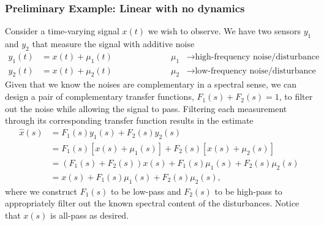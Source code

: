 \documentclass[a4paper]{article}
\begin{document}
\subsubsection*{Preliminary Example: Linear with no dynamics}
Consider a time-varying signal $x(t)$ we wish to observe.
We have two sensors $y_1$ and $y_2$ that measure the signal with additive noise
\begin{equation}
\begin{split}
y_1(t) &= x(t) + \mu_1(t) \\
y_2(t) &= x(t) + \mu_2(t)
\end{split}
\qquad\qquad\qquad
\begin{split}
\mu_1 &\rightarrow \text{high-frequency noise/disturbance} \\
\mu_2 &\rightarrow \text{low-frequency noise/disturbance}
\end{split}
\end{equation}
Given that we know the noises are complementary in a spectral sense, we can design a pair of complementary transfer functions, $F_1(s) + F_2(s) = 1$, to filter out the noise while allowing the signal to pass.
Filtering each measurement through its corresponding transfer function results in the estimate
\begin{align}
\hat{x}(s) &= F_1(s)y_1(s) + F_2(s)y_2(s) \nonumber \\
           &= F_1(s)\left[x(s) + \mu_1(s)\right] + F_2(s)\left[x(s) + \mu_2(s)\right] \nonumber \\
           &= (F_1(s)+F_2(s))x(s) + F_1(s)\mu_1(s) + F_2(s)\mu_2(s) \nonumber \\
           &= x(s) + F_1(s)\mu_1(s) + F_2(s)\mu_2(s),
\end{align}
where we construct $F_1(s)$ to be low-pass and $F_2(s)$ to be high-pass to appropriately filter out the known spectral content of the disturbances.
Notice that $x(s)$ is all-pass as desired.
\end{document}
